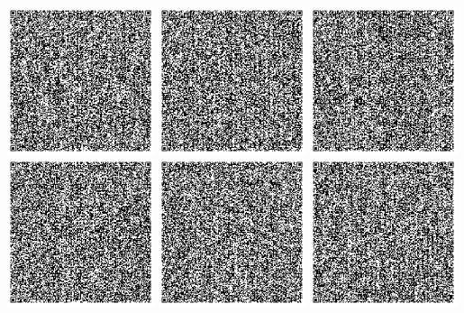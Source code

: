 \documentclass[twocolumn]{article}
\begin{document}
\includegraphics[height=1.7in]{q07}
\includegraphics[height=1.7in]{q08}
\includegraphics[height=1.7in]{q09}
\includegraphics[height=1.7in]{q10}
\includegraphics[height=1.7in]{q11}
\includegraphics[height=1.7in]{q12}
\end{document}
